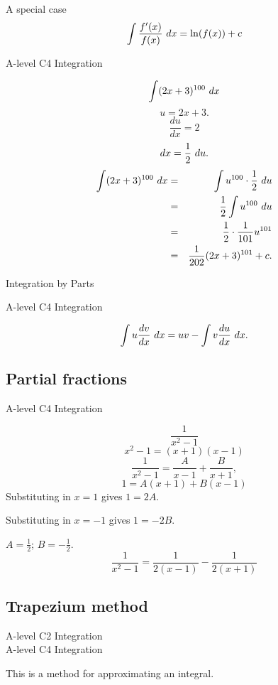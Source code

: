 \documentclass[11pt,a4paper,oneside]{book}
\begin{document}
\begin{thing}{A special case}
\[\int \frac{f'(x)}{f(x)}\dx=\ln(f(x))+c\]
\end{thing}


\begin{example}
\begin{gce}
A-level C4 Integration
\end{gce}
$$\int(2x+3)^{100}\dx$$
\[u=2x+3.\]
\[\frac{du}{dx}=2\]
\[dx=\frac{1}{2}\dx[u].\]
\begin{eqnarray*}
\int (2x+3)^{100}\dx &=& \int u^{100}\cdot \frac{1}{2}\dx[u] \\
&=& \frac{1}{2}\int u^{100}\dx[u] \\
&=& \frac{1}{2}\cdot\frac{1}{101}u^{101} \\
&=& \frac{1}{202}(2x+3)^{101}+c.
\end{eqnarray*}
\end{example}

\begin{thing}{Integration by Parts}
\begin{gce}
A-level C4 Integration
\end{gce}
\begin{equation*}
\int u\frac{dv}{dx}\dx=uv-\int v\frac{du}{dx}\dx.
\end{equation*}
\end{thing}

\subsection{Partial fractions}
\begin{gce}
A-level C4 Integration
\end{gce}
\begin{example}
\[\frac{1}{x^2-1}\]
\[x^2-1 = (x+1)(x-1)\]
\[\frac{1}{x^2-1}=\frac{A}{x-1}+\frac{B}{x+1},\]
\[1=A(x+1)+B(x-1)\]
Substituting in \(x=1\) gives \(1=2A.\)

Substituting in \(x=-1\) gives \(1=-2B.\)

$A=\tfrac12$; $B=-\tfrac12$.
\[\frac{1}{x^2-1}=\frac{1}{2(x-1)}-\frac{1}{2(x+1)}\]
\end{example}

\subsection{Trapezium method}
\begin{gce}
A-level C2 Integration\\
A-level C4 Integration
\end{gce}
This is a method for approximating an integral.
\end{document}
